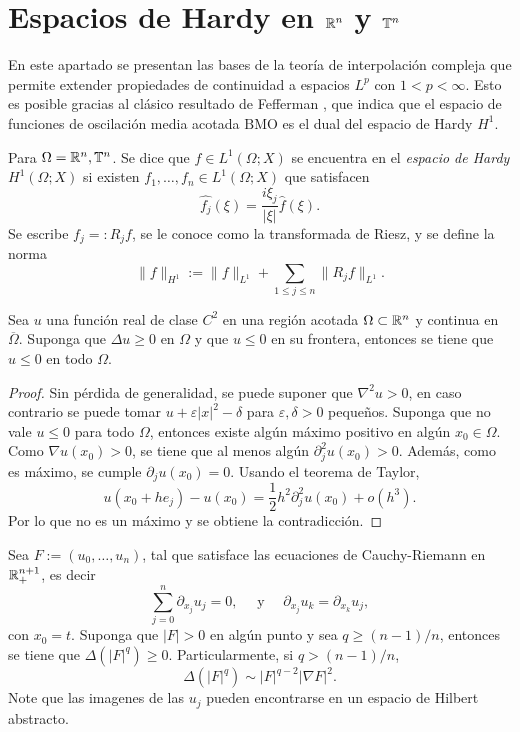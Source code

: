 \section{Espacios de Hardy en $\mathbb{R}^n$ y $\mathbb{T}^n$}
En este apartado se presentan las bases de la teoría de interpolación compleja que permite extender propiedades de continuidad a espacios $L^p$ con $1<p<\infty$. Esto es posible gracias al clásico resultado de Fefferman \cite{fefferman-BMO}, que indica que el espacio de funciones de oscilación media acotada $\mathrm{BMO}$ es el dual del espacio de Hardy $H^1$. 
\begin{definition}
	Para $\Omega = \mathbb{R}^n, \mathbb{T}^n$. Se dice que $f\in L^1(\Omega;X)$ se encuentra en el \textit{espacio de Hardy} $H^1(\Omega;X)$ si existen $f_1,\ldots,f_n\in L^1(\Omega;X)$ que satisfacen
	\begin{equation*}
		\widehat{f_j} (\xi)= \frac{i\xi_j}{|\xi|}\widehat{f}(\xi).
	\end{equation*}
	Se escribe $f_j=:R_jf$, se le conoce como la transformada de Riesz, y se define la norma 
	\begin{equation*}
		\|f\|_{H^1} := \|f\|_{L^1} + \sum_{1\leq j\leq n} \|R_jf\|_{L^1}.
	\end{equation*}
\end{definition}
\begin{proposition}
	Sea $u$ una función real de clase $C^2$ en una región acotada $\Omega\subset\mathbb{R}^n$ y continua en $\overline{\Omega}$. Suponga que $\Delta u \geq 0$ en $\Omega$ y que $u\leq0$ en su frontera, entonces se tiene que $u\leq 0$ en todo $\Omega$. 
\end{proposition}
\begin{proof}
	Sin pérdida de generalidad, se puede suponer que $\nabla^2 u > 0$, en caso contrario se puede tomar $u+\varepsilon|x|^2 - \delta$ para $\varepsilon,\delta>0$ pequeños. Suponga que no vale $u\leq 0$ para todo $\Omega$, entonces existe algún máximo positivo en algún $x_0\in\Omega$. Como $\nabla u(x_0) >0$, se tiene que al menos algún $\partial^2_j u(x_0) > 0$. Además, como es máximo, se cumple $\partial_j u(x_0) = 0$. Usando el teorema de Taylor,
	\begin{equation*}
		u(x_0+he_j) - u(x_0) = \frac{1}{2} h^2\partial^2_j u(x_0) + o(h^3).
	\end{equation*}
	Por lo que no es un máximo y se obtiene la contradicción.
\end{proof}
\begin{lemma}\label{lem:subharmonic-gradient}
	Sea $F:=(u_0,\ldots,u_n)$, tal que satisface las ecuaciones de Cauchy-Riemann en $\mathbb{R}^{n+1}_+$, es decir 
	\begin{equation*}
		\sum_{j=0}^n \partial_{x_j}u_j = 0, \quad \text{ y } \quad \partial_{x_j}u_k = \partial_{x_k}u_j,
	\end{equation*}
	con $x_0=t$.  Suponga que $|F|>0$ en algún punto y sea $q\geq(n-1)/n$, entonces se tiene que $\Delta(|F|^q) \geq 0$. Particularmente, si $q>(n-1)/n$, 
	\begin{equation*}
		\Delta(|F|^q) \sim |F|^{q-2}|\nabla F|^2.
	\end{equation*}
	Note que las imagenes de las $u_j$ pueden encontrarse en un espacio de Hilbert abstracto.
\end{lemma}
